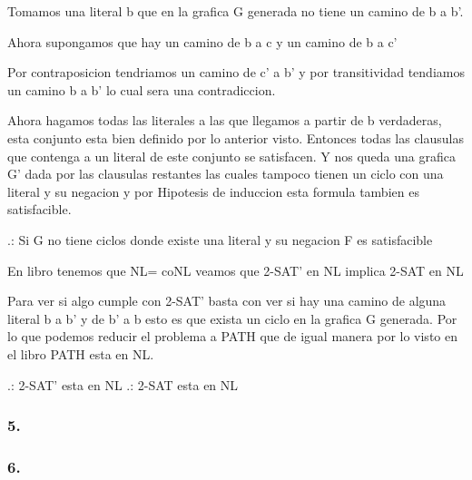 \documentclass[12pt]{article}
\begin{document}
Tomamos una literal b que en la grafica G generada no tiene un camino de b a b’.

Ahora supongamos que hay un camino de b a c y un camino de b a c’

Por contraposicion tendriamos un camino de c’ a b’ y por transitividad tendiamos un camino  b a b’ lo cual sera una contradiccion.

Ahora hagamos todas las literales  a las que llegamos a partir de b verdaderas, esta conjunto esta bien definido por lo anterior visto. Entonces todas las clausulas que contenga a un literal de este conjunto se satisfacen. Y nos queda una grafica G’ dada por las clausulas restantes las cuales tampoco tienen un ciclo con una literal y su negacion y por Hipotesis de induccion esta formula tambien es satisfacible.

.: Si G no tiene ciclos donde existe una literal y su negacion F es satisfacible




En libro tenemos que NL= coNL veamos que 2-SAT’ en NL implica 2-SAT en NL

Para ver si algo cumple con 2-SAT’ basta con ver si hay una camino de alguna literal b a b’ y de b’ a b esto es que exista un ciclo en la grafica G generada. Por lo que podemos reducir el problema a PATH que de igual manera por lo visto en el libro PATH esta en NL.

.: 2-SAT’ esta en NL 
.: 2-SAT esta en NL

\subsubsection*{5.}

\subsubsection*{6.}
\end{document}
